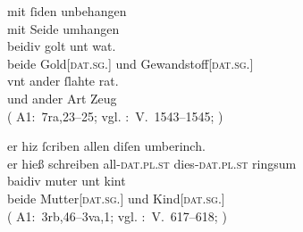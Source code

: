 \begin{exe}
\ex \label{ex:datregul}
	\gll mit ſiden unbehangen \\
		mit Seide umhangen \\
\sn \gll beidiv golt unt wat. \\
		beide Gold[\textsc{dat.sg.\NeutI}] und Gewandstoff[\textsc{dat.sg.\FemI}] \\
\sn \gll vnt ander ſlahte rat. \\
		und ander Art Zeug \\
	\trans {}
		(%
			A1:~7ra,23--25; vgl.
			\KC:~V.~1543--1545;
			\cite[109]{schroeder1895}%
		)

\ex \label{ex:datextra}
		\gll er hiz ſcriben allen diſen umberinch. \\
			er hieß schreiben all-\textsc{dat.pl.st} dies-\textsc{dat.pl.st} ringsum \\
	\sn \gll baidiv muter unt kint \\
			beide Mutter[\textsc{dat.sg.\FemF}] und Kind[\textsc{dat.sg.\NeutA}] \\
		\trans {}
			(%
				A1:~3rb,46--3va,1; vgl.
				\KC:~V.~617--618;
				\cite[92]{schroeder1895}%
			)

\end{exe}

